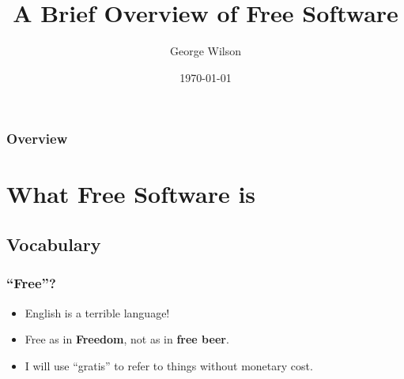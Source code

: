 \documentclass{beamer}
\title[Free Software]{A Brief Overview of Free Software} %
\author{George Wilson} %
\institute[Griffith University] %
{
Griffith University \\ %
\medskip
\href{http://www.github.com/gwils}{www.github.com/gwils} \\
\href{http://www.twitter.com/GeorgeTalksCode}{@GeorgeTalksCode} %
}
\date{\today} %
\begin{document}
\begin{frame}
\titlepage %
\end{frame}

\begin{frame}
\frametitle{Overview} %
\tableofcontents %
\end{frame}


\section{What Free Software is} %

\subsection{Vocabulary} %

\begin{frame}
\frametitle{``Free''?}
\begin{itemize}
\item English is a terrible language!
\item Free as in {\bf Freedom}, not as in {\bf free beer}.
\item I will use ``gratis'' to refer to things without monetary cost.
\end{itemize}

\end{frame}
\end{document}
